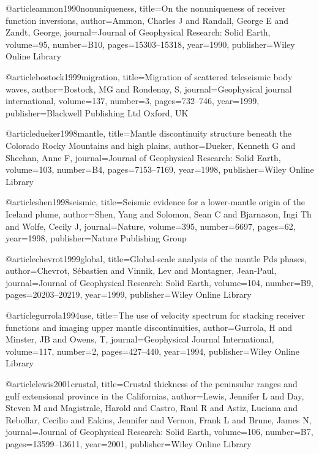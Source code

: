 @article{ammon1990nonuniqueness,
  title={On the nonuniqueness of receiver function inversions},
  author={Ammon, Charles J and Randall, George E and Zandt, George},
  journal={Journal of Geophysical Research: Solid Earth},
  volume={95},
  number={B10},
  pages={15303--15318},
  year={1990},
  publisher={Wiley Online Library}
}

@article{bostock1999migration,
  title={Migration of scattered teleseismic body waves},
  author={Bostock, MG and Rondenay, S},
  journal={Geophysical journal international},
  volume={137},
  number={3},
  pages={732--746},
  year={1999},
  publisher={Blackwell Publishing Ltd Oxford, UK}
}

@article{dueker1998mantle,
  title={Mantle discontinuity structure beneath the Colorado Rocky Mountains and high plains},
  author={Dueker, Kenneth G and Sheehan, Anne F},
  journal={Journal of Geophysical Research: Solid Earth},
  volume={103},
  number={B4},
  pages={7153--7169},
  year={1998},
  publisher={Wiley Online Library}
}

@article{shen1998seismic,
  title={Seismic evidence for a lower-mantle origin of the Iceland plume},
  author={Shen, Yang and Solomon, Sean C and Bjarnason, Ingi Th and Wolfe, Cecily J},
  journal={Nature},
  volume={395},
  number={6697},
  pages={62},
  year={1998},
  publisher={Nature Publishing Group}
}


@article{chevrot1999global,
  title={Global-scale analysis of the mantle Pds phases},
  author={Chevrot, S{\'e}bastien and Vinnik, Lev and Montagner, Jean-Paul},
  journal={Journal of Geophysical Research: Solid Earth},
  volume={104},
  number={B9},
  pages={20203--20219},
  year={1999},
  publisher={Wiley Online Library}
}


@article{gurrola1994use,
  title={The use of velocity spectrum for stacking receiver functions and imaging upper mantle discontinuities},
  author={Gurrola, H and Minster, JB and Owens, T},
  journal={Geophysical Journal International},
  volume={117},
  number={2},
  pages={427--440},
  year={1994},
  publisher={Wiley Online Library}
}


@article{lewis2001crustal,
  title={Crustal thickness of the peninsular ranges and gulf extensional province in the Californias},
  author={Lewis, Jennifer L and Day, Steven M and Magistrale, Harold and Castro, Raul R and Astiz, Luciana and Rebollar, Cecilio and Eakins, Jennifer and Vernon, Frank L and Brune, James N},
  journal={Journal of Geophysical Research: Solid Earth},
  volume={106},
  number={B7},
  pages={13599--13611},
  year={2001},
  publisher={Wiley Online Library}
}


